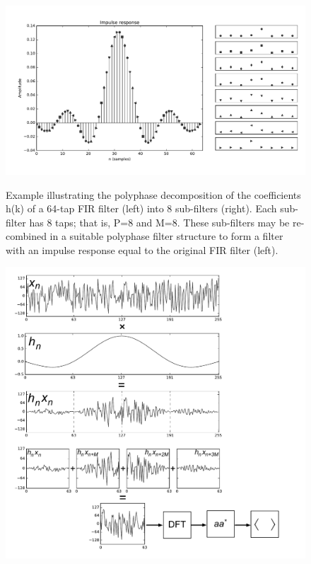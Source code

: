 \documentclass{ws-rv961x669}
\begin{document}
\begin{figure}
 \centering
 \includegraphics[width=\textwidth]{./figures/pfb_taps}
 \label{fig:pfb_taps}
 \caption{Example illustrating the polyphase decomposition of the coefficients h(k) of a 64-tap FIR filter (left) into 8 sub-filters (right). Each sub-filter has 8 taps; that is, P=8 and M=8. These sub-filters may be re-combined in a suitable polyphase filter structure to form a filter with an impulse response equal to the original FIR filter (left).}
\end{figure}

\begin{figure}
 \centering
 \includegraphics[width=\textwidth]{./figures/pfb_chart}
 \label{fig:pfb_chart}
 \caption{}
\end{figure}
\end{document}
